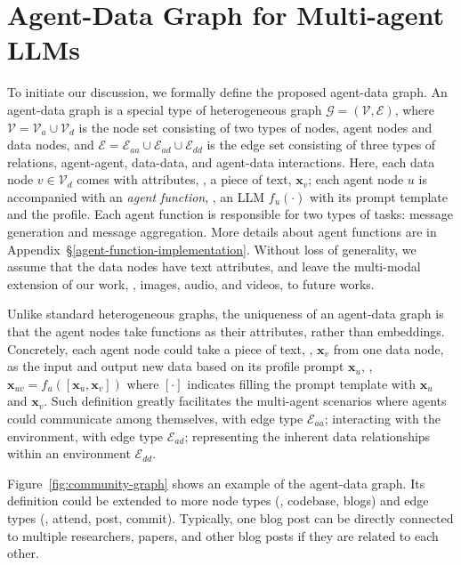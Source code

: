 \vspace{-2mm}
\section{Agent-Data Graph for Multi-agent LLMs}
\label{sec:community-graph-design}

To initiate our discussion, we formally define the proposed agent-data graph. An agent-data graph is a special type of heterogeneous graph $ \mathcal{G} = (\mathcal{V}, \mathcal{E}) $, where $ \mathcal{V} = \mathcal{V}_a \cup \mathcal{V}_d $ is the node set consisting of two types of nodes, agent nodes and data nodes, and $\mathcal{E} = \mathcal{E}_{aa} \cup \mathcal{E}_{ad} \cup \mathcal{E}_{dd}$ is the edge set consisting of three types of relations, agent-agent, data-data, and agent-data interactions.
Here, each data node $v \in \mathcal{V}_d$ comes with attributes, \eg, a piece of text, $\mathbf{x}_v$; each agent node $u$ is accompanied with an \textit{agent function}, \eg, an LLM $f_u(\cdot)$ with its prompt template and the profile. Each agent function is responsible for two types of tasks: message generation and message aggregation. More details about agent functions are in Appendix~\S\ref{agent-function-implementation}. Without loss of generality, we assume that the data nodes have text attributes, and leave the multi-modal extension of our work, \eg, images, audio, and videos, to future works.

Unlike standard heterogeneous graphs, the uniqueness of an agent-data graph is that the agent nodes take functions as their attributes, rather than embeddings. Concretely, each agent node could take a piece of text, \eg, $\mathbf{x}_v$ from one data node, as the input and output new data based on its profile prompt $\mathbf{x}_u$, \eg, $\mathbf{x}_{uv} = f_u([\mathbf{x}_u, \mathbf{x}_v])$ where $[\cdot]$ indicates filling the prompt template with $\mathbf{x}_u$ and $\mathbf{x}_v$. Such definition greatly facilitates the multi-agent scenarios where agents could communicate among themselves, with edge type $\mathcal{E}_{aa}$; interacting with the environment, with edge type $\mathcal{E}_{ad}$; representing the inherent data relationships within an environment $\mathcal{E}_{dd}$.

 Figure~\ref{fig:community-graph} shows an example of the agent-data graph. Its definition could be extended to more node types (\eg, codebase, blogs) and edge types (\eg, attend, post, commit). Typically, one blog post can be directly connected to multiple researchers, papers, and other blog posts if they are related to each other.

